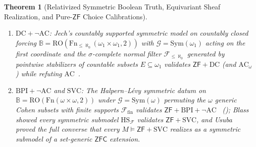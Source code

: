 \documentclass[10pt,twoside,openright]{book}
\theoremstyle{crmplain}
\newtheorem{theorem}{Theorem}[section]
\theoremstyle{crmdef}
\theoremstyle{crmremark}
\begin{document}
\begin{theorem}[Relativized Symmetric Boolean Truth, Equivariant Sheaf Realization, and Pure-$\mathsf{ZF}$ Choice Calibrations]
\begin{enumerate}[label=\textup{(\roman*)},leftmargin=2.0em]
\begin{enumerate}[label=\textup{(\alph*)},leftmargin=1.6em]
    \item \emph{$\mathrm{DC} + \neg\mathrm{AC}$:} Jech's countably supported symmetric model on countably closed forcing $\mathbb{B} = \mathrm{RO}(\mathrm{Fn}_{\le \aleph_0}(\omega_1 \times \omega_1, 2))$ with $\mathcal{G} = \mathrm{Sym}(\omega_1)$ acting on the first coordinate and the $\sigma$-complete normal filter $\mathcal{F}_{\le \aleph_0}$ generated by pointwise stabilizers of countable subsets $E \subseteq \omega_1$ validates $\mathsf{ZF} + \mathrm{DC}$ (and $\mathrm{AC}_\omega$) while refuting $\mathrm{AC}$~\cite[\S 8.1]{Jech73}.
    \item \emph{$\mathrm{BPI} + \neg\mathrm{AC}$ and $\mathrm{SVC}$:} The Halpern--L\'evy symmetric datum on $\mathbb{B} = \mathrm{RO}(\mathrm{Fn}(\omega \times \omega, 2))$ under $\mathcal{G} = \mathrm{Sym}(\omega)$ permuting the $\omega$ generic Cohen subsets with finite supports $\mathcal{F}_{\mathrm{fin}}$ validates $\mathsf{ZF} + \mathrm{BPI} + \neg\mathrm{AC}$~\cite{HalpernLevy71} (\cite[Ch.~7]{Jech73}); Blass~\cite[Theorems~4.2--4.3]{Blass79} showed every symmetric submodel $\mathrm{HS}_{\mathcal{F}}$ validates $\mathsf{ZF} + \mathrm{SVC}$, and Usuba~\cite{Usuba21} proved the full converse that every $M \models \mathsf{ZF} + \mathrm{SVC}$ realizes as a symmetric submodel of a set-generic $\mathsf{ZFC}$ extension.
  \end{enumerate}
\end{enumerate}
\end{theorem}
\end{document}
